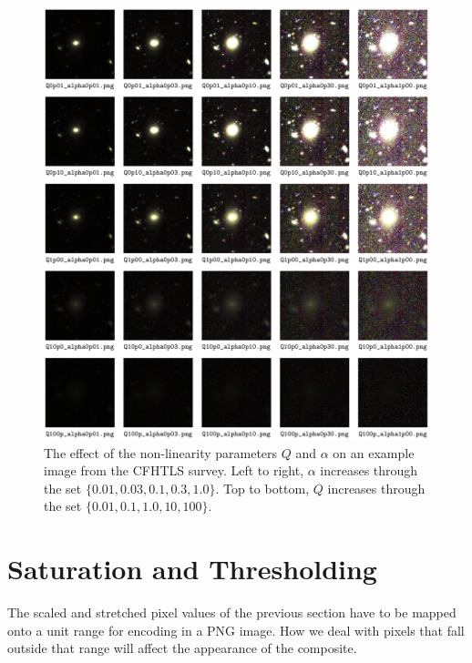 \documentclass[letterpaper, 11pt]{article}
\begin{document}
\begin{figure}
\centering\includegraphics[width=0.9\linewidth]{Images/CFHTLS_27_Q-alpha_gallery.png}
\caption{The effect of the non-linearity parameters $Q$ and $\alpha$ on an
example image from the CFHTLS survey. Left to right, $\alpha$ increases
through the set $\{0.01,0.03,0.1,0.3,1.0\}$. Top to bottom, $Q$ increases
through the set $\{0.01,0.1,1.0,10,100\}$.}
\label{fig:stretch}
\end{figure}

\section{Saturation and Thresholding}
\label{sec:saturation}

The scaled and stretched pixel values of the previous section have to be
mapped onto a unit range for encoding in a PNG image. How we deal with pixels
that fall outside that range will affect the appearance of the composite.
\end{document}
